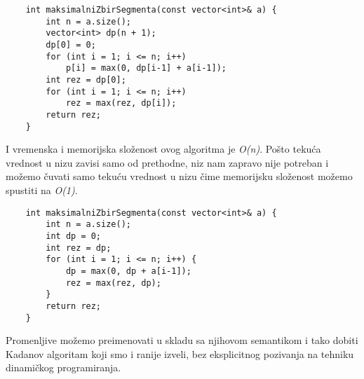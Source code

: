 \documentclass{article}
\begin{document}
\begin{lstlisting}
    int maksimalniZbirSegmenta(const vector<int>& a) {
        int n = a.size();
        vector<int> dp(n + 1);
        dp[0] = 0;
        for (int i = 1; i <= n; i++)
            p[i] = max(0, dp[i-1] + a[i-1]);
        int rez = dp[0];
        for (int i = 1; i <= n; i++)
            rez = max(rez, dp[i]);
        return rez;
    }
\end{lstlisting}
I vremenska i memorijska složenost ovog algoritma je \textit{O(n)}.
Pošto tekuća vrednost u nizu zavisi samo od prethodne, niz nam zapravo nije
potreban i možemo čuvati samo tekuću vrednost u nizu čime memorijsku složenost
možemo spustiti na \textit{O(1)}.
\begin{lstlisting}
    int maksimalniZbirSegmenta(const vector<int>& a) {
        int n = a.size();
        int dp = 0;
        int rez = dp;
        for (int i = 1; i <= n; i++) {
            dp = max(0, dp + a[i-1]);
            rez = max(rez, dp);
        }
        return rez;
    }
\end{lstlisting}
Promenljive možemo preimenovati u skladu sa njihovom semantikom i tako
dobiti Kadanov algoritam koji smo i ranije izveli, bez eksplicitnog pozivanja na tehniku dinamičkog programiranja.
\end{document}
